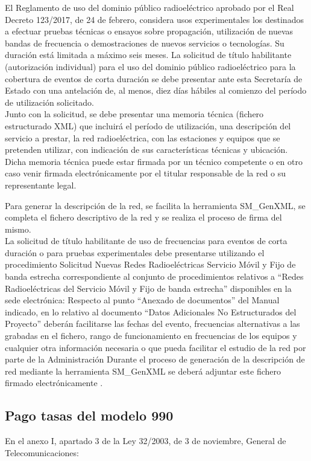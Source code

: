 El Reglamento de uso del dominio público radioeléctrico aprobado por el Real Decreto 123/2017, de 24 de febrero, considera usos experimentales los destinados a efectuar pruebas técnicas o ensayos sobre propagación, utilización de nuevas bandas de frecuencia o demostraciones de nuevos servicios o tecnologías. Su duración está limitada a máximo seis meses. 
La solicitud de título habilitante (autorización individual) para el uso del dominio público radioeléctrico para la cobertura de eventos de corta duración se debe presentar ante esta Secretaría de Estado con una antelación de, al menos, diez días hábiles al comienzo del período de utilización solicitado.\\ 

Junto con la solicitud, se debe presentar una memoria técnica (fichero estructurado XML) que incluirá el período de utilización, una descripción del servicio a prestar, la red radioeléctrica, con las estaciones y equipos que se pretenden utilizar, con indicación de sus características técnicas y ubicación. Dicha memoria técnica puede estar firmada por un técnico competente o en otro caso venir firmada electrónicamente por el titular responsable de la red o su representante legal. 

Para generar la descripción de la red, se facilita la herramienta SM\_GenXML, se completa el fichero descriptivo de la red y se realiza el proceso de firma del mismo. \\

La solicitud de título habilitante de uso de frecuencias para eventos de corta duración o para pruebas experimentales debe presentarse utilizando el procedimiento Solicitud Nuevas Redes Radioeléctricas Servicio Móvil y Fijo de banda estrecha correspondiente al conjunto de procedimientos relativos a “Redes Radioeléctricas del Servicio Móvil y Fijo de banda estrecha” disponibles en la sede electrónica:
Respecto al punto “Anexado de documentos” del Manual indicado, en lo relativo al documento “Datos Adicionales No Estructurados del Proyecto” deberán facilitarse las fechas del evento, frecuencias alternativas a las grabadas en el fichero, rango de funcionamiento en frecuencias de los equipos y cualquier otra información necesaria o que pueda facilitar el estudio de la red por parte de la Administración 
Durante el proceso de generación de la descripción de red mediante la herramienta SM\_GenXML se deberá adjuntar este fichero firmado electrónicamente .

\subsection{Pago tasas del modelo 990}
En el anexo I, apartado 3 de la Ley 32/2003, de 3 de noviembre, General de Telecomunicaciones:\\

